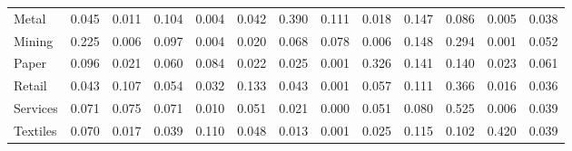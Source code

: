 \begin{table}[htbp]
\begin{tabular}{lcccccccccccc}
  Metal & \textcolor[RGB]{126,81,129}{0.045} & \textcolor[RGB]{204,132,51}{0.011} & \textcolor[RGB]{60,39,195}{0.104} & \textcolor[RGB]{227,147,28}{0.004} & \textcolor[RGB]{133,86,122}{0.042} & \textcolor[RGB]{9,6,246}{0.390} & \textcolor[RGB]{53,34,202}{0.111} & \textcolor[RGB]{179,116,76}{0.018} & \textcolor[RGB]{35,23,220}{0.147} & \textcolor[RGB]{76,49,179}{0.086} & \textcolor[RGB]{221,143,34}{0.005} & \textcolor[RGB]{142,92,113}{0.038} \\ 
  Mining & \textcolor[RGB]{25,16,230}{0.225} & \textcolor[RGB]{212,138,42}{0.006} & \textcolor[RGB]{67,44,188}{0.097} & \textcolor[RGB]{223,144,32}{0.004} & \textcolor[RGB]{175,113,80}{0.020} & \textcolor[RGB]{97,63,158}{0.068} & \textcolor[RGB]{83,54,172}{0.078} & \textcolor[RGB]{211,136,44}{0.006} & \textcolor[RGB]{34,22,221}{0.148} & \textcolor[RGB]{19,13,236}{0.294} & \textcolor[RGB]{250,162,5}{0.001} & \textcolor[RGB]{113,73,142}{0.052} \\ 
  Paper & \textcolor[RGB]{69,45,186}{0.096} & \textcolor[RGB]{174,112,81}{0.021} & \textcolor[RGB]{104,68,151}{0.060} & \textcolor[RGB]{78,50,177}{0.084} & \textcolor[RGB]{166,108,89}{0.022} & \textcolor[RGB]{156,101,99}{0.025} & \textcolor[RGB]{244,158,11}{0.001} & \textcolor[RGB]{12,8,243}{0.326} & \textcolor[RGB]{37,24,218}{0.141} & \textcolor[RGB]{41,26,214}{0.140} & \textcolor[RGB]{161,104,94}{0.023} & \textcolor[RGB]{103,66,152}{0.061} \\ 
  Retail & \textcolor[RGB]{131,85,124}{0.043} & \textcolor[RGB]{58,38,197}{0.107} & \textcolor[RGB]{110,71,145}{0.054} & \textcolor[RGB]{147,95,108}{0.032} & \textcolor[RGB]{44,29,211}{0.133} & \textcolor[RGB]{129,84,126}{0.043} & \textcolor[RGB]{251,163,4}{0.001} & \textcolor[RGB]{106,69,149}{0.057} & \textcolor[RGB]{55,36,200}{0.111} & \textcolor[RGB]{11,7,244}{0.366} & \textcolor[RGB]{186,120,69}{0.016} & \textcolor[RGB]{145,94,110}{0.036} \\ 
  Services & \textcolor[RGB]{94,61,161}{0.071} & \textcolor[RGB]{87,56,168}{0.075} & \textcolor[RGB]{92,60,163}{0.071} & \textcolor[RGB]{207,134,48}{0.010} & \textcolor[RGB]{117,76,138}{0.051} & \textcolor[RGB]{172,111,83}{0.021} & \textcolor[RGB]{253,164,2}{0.000} & \textcolor[RGB]{115,74,140}{0.051} & \textcolor[RGB]{81,53,174}{0.080} & \textcolor[RGB]{0,0,255}{0.525} & \textcolor[RGB]{214,139,41}{0.006} & \textcolor[RGB]{138,89,117}{0.039} \\ 
  Textiles & \textcolor[RGB]{96,62,159}{0.070} & \textcolor[RGB]{182,118,73}{0.017} & \textcolor[RGB]{140,91,115}{0.039} & \textcolor[RGB]{57,37,198}{0.110} & \textcolor[RGB]{122,79,133}{0.048} & \textcolor[RGB]{193,125,62}{0.013} & \textcolor[RGB]{248,160,7}{0.001} & \textcolor[RGB]{158,102,97}{0.025} & \textcolor[RGB]{50,32,205}{0.115} & \textcolor[RGB]{64,41,191}{0.102} & \textcolor[RGB]{7,5,248}{0.420} & \textcolor[RGB]{136,88,119}{0.039} \\ 

\end{tabular}
\end{table}
